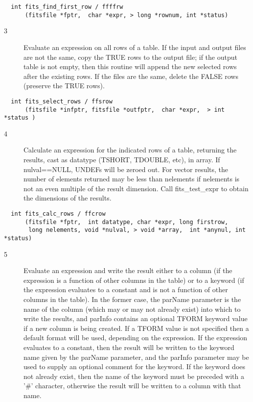 \documentclass[11pt]{book}
\begin{document}
\begin{verbatim}
  int fits_find_first_row / ffffrw
      (fitsfile *fptr,  char *expr, > long *rownum, int *status)
\end{verbatim}

\begin{description}
\item[3 ]Evaluate an expression on all rows of a table.  If the input and output
files are not the same, copy the TRUE rows to the output file; if the output
table is not empty, then this routine will append the new
selected rows after the existing rows.   If the
files are the same, delete the FALSE rows (preserve the TRUE rows). \label{ffsrow}
\end{description}

\begin{verbatim}
  int fits_select_rows / ffsrow
      (fitsfile *infptr, fitsfile *outfptr,  char *expr,  > int *status )
\end{verbatim}

\begin{description}
\item[4 ] Calculate an expression for the indicated rows of a table, returning
the results, cast as datatype (TSHORT, TDOUBLE, etc), in array.  If
nulval==NULL, UNDEFs will be zeroed out.  For vector results, the number
of elements returned may be less than nelements if nelements is not an
even multiple of the result dimension.  Call fits\_test\_expr to obtain
the dimensions of the results.  \label{ffcrow}
\end{description}

\begin{verbatim}
  int fits_calc_rows / ffcrow
      (fitsfile *fptr,  int datatype, char *expr, long firstrow,
       long nelements, void *nulval, > void *array,  int *anynul, int *status)
\end{verbatim}

\begin{description}
\item[5 ]Evaluate an expression and write the result either to a column (if
the expression is a function of other columns in the table) or to a
keyword (if the expression evaluates to a constant and is not a
function of other columns in the table).  In the former case, the
parName parameter is the name of the column (which may or may not already
exist) into which to write the results, and parInfo contains an
optional TFORM keyword value if a new column is being created.  If a
TFORM value is not specified then a default format will be used,
depending on the expression.  If the expression evaluates to a constant,
then the result will be written to the keyword name given by the
parName parameter, and the parInfo parameter may be used to supply an
optional comment for the keyword.  If the keyword does not already
exist, then the name of the keyword must be preceded with a '\#' character,
 otherwise the result will be written to a column with that name. \label{ffcalc}
\end{description}
\end{document}
